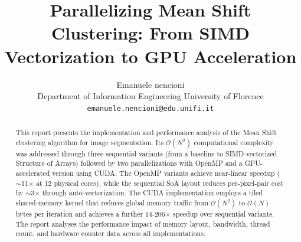 \documentclass[10pt,twocolumn,letterpaper]{article}
\begin{document}
\title{Parallelizing Mean Shift Clustering: From SIMD Vectorization to GPU Acceleration}

\author{Emanuele nencioni\\
Department of Information Engineering
University of Florence\\
{\tt\small emanuele.nencioni@edu.unifi.it}
}

\maketitle
\thispagestyle{empty}

\begin{abstract}
    This report presents the implementation and performance analysis of the Mean Shift clustering algorithm for image segmentation. Its $\mathcal O(N^2)$ computational complexity was addressed through three sequential variants (from a baseline to SIMD-vectorized Structure of Arrays) followed by two parallelizations with OpenMP and a GPU-accelerated version using CUDA. The OpenMP variants achieve near-linear speedup ($\sim$11$\times$ at 12 physical cores), while the sequential SoA layout reduces per-pixel-pair cost by $\sim$3$\times$ through auto-vectorization. The CUDA implementation employs a tiled shared-memory kernel that reduces global memory traffic from $\mathcal O(N^2)$ to $\mathcal O(N)$ bytes per iteration and achieves a further 14-206$\times$ speedup over sequential variants. The report analyses the performance impact of memory layout, bandwidth, thread count, and hardware counter data across all implementations.



\end{abstract}
\end{document}
